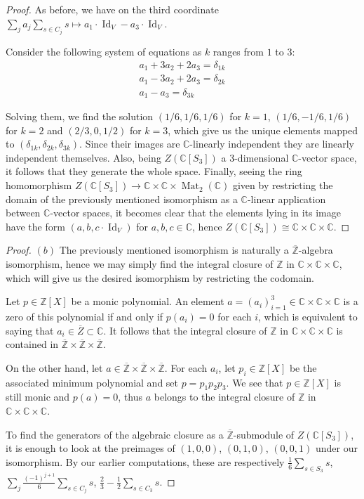\documentclass{article}
\newcommand{\numberset}{\mathbb}
\newcommand{\Z}{\numberset{Z}}
\newcommand{\C}{\numberset{C}}
\DeclareMathOperator{\Id}{Id}
\DeclareMathOperator{\Mat}{Mat}
\begin{document}
\begin{proof}
    As before, we have on the third coordinate $\sum_ja_j\sum_{s\in C_j}s\mapsto
    a_1\cdot\Id_V-a_3\cdot\Id_V$.

    Consider the following system of equations as $k$ ranges from $1$ to $3$:
    \begin{align*}
        a_1+3a_2+2a_3=\delta_{1k} \\
        a_1-3a_2+2a_3=\delta_{2k} \\
        a_1-a_3=\delta_{3k}
    \end{align*}

    Solving them, we find the solution $(1/6,1/6,1/6)$ for $k=1$,
    $(1/6,-1/6,1/6)$ for $k=2$ and $(2/3,0,1/2)$ for $k=3$, which give us the
    unique elements mapped to $(\delta_{1k},\delta_{2k},\delta_{3k})$. Since
    their images are $\C$-linearly independent they are linearly independent
    themselves. Also, being $Z(\C[S_3])$ a 3-dimensional $\C$-vector space,
    it follows that they generate the whole space. Finally, seeing the ring
    homomorphism $Z(\C[S_3])\rightarrow\C\times\C\times\Mat_2(\C)$ given by
    restricting the domain of the previously mentioned isomorphism as a
    $\C$-linear application between $\C$-vector spaces, it becomes clear that
    the elements lying in its image have the form $(a,b,c\cdot\Id_V)$ for
    $a,b,c\in\C$, hence $Z(\C[S_3])\cong\C\times\C\times\C$.
\end{proof}

\begin{proof}
    $(b)$ The previously mentioned isomorphism is naturally a
    $\overline{\Z}$-algebra isomorphism, hence we may simply find the integral
    closure of $\Z$ in $\C\times\C\times\C$, which will give us the desired
    isomorphism by restricting the codomain.

    Let $p\in\Z[X]$ be a monic polynomial. An element
    $a=(a_i)_{i=1}^3\in\C\times\C\times\C$ is a zero
    of this polynomial if and only if $p(a_i)=0$ for each $i$, which is
    equivalent to saying that $a_i\in\overline{Z}\subset\C$. It follows that the
    integral closure of $\Z$ in $\C\times\C\times\C$ is contained in
    $\overline{\Z}\times\overline{\Z}\times\overline{\Z}$.

    On the other hand, let
    $a\in\overline{\Z}\times\overline{\Z}\times\overline{\Z}$. For each $a_i$,
    let $p_i\in\Z[X]$ be the associated minimum polynomial and set
    $p=p_1p_2p_3$. We see that $p\in\Z[X]$ is still monic and $p(a)=0$, thus $a$
    belongs to the integral closure of $\Z$ in $\C\times\C\times\C$.

    To find the generators of the algebraic closure as a
    $\overline{\Z}$-submodule of $Z(\C[S_3])$, it is enough to look at the
    preimages of $(1,0,0)$, $(0,1,0)$, $(0,0,1)$ under our isomorphism. By our
    earlier computations, these are respectively $\frac{1}{6}\sum_{s\in S_3}s$,
    $\sum_j\frac{(-1)^{j+1}}{6}\sum_{s\in C_j}s$,
    $\frac{2}{3}-\frac{1}{2}\sum_{s\in C_3}s$.
\end{proof}



\printbibliography
\end{document}
